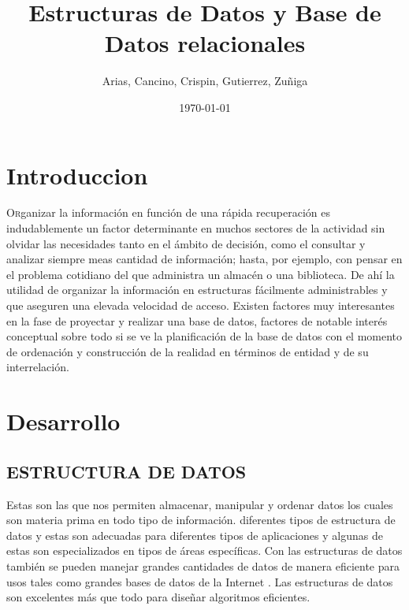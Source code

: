 \documentclass[twoside,twocolumn]{article}
\title{Estructuras de Datos y Base de Datos relacionales} %
\author{Arias, Cancino, Crispin, Gutierrez, Zuñiga}
\date{\today} %
\begin{document}
\maketitle


\section{Introduccion}

\lettrine[nindent=0em,lines=3]{O}rganizar la información en función de una rápida recuperación es indudablemente un factor determinante en muchos sectores de la actividad sin olvidar las necesidades tanto en el ámbito de decisión, como el consultar y analizar siempre meas cantidad de información; hasta, por ejemplo, con pensar en el problema cotidiano del que administra un almacén o una biblioteca. De ahí la utilidad de organizar la información en estructuras fácilmente administrables y que aseguren una elevada velocidad de acceso.
Existen factores muy interesantes en la fase de proyectar y realizar una base de datos, factores de notable interés conceptual sobre todo si se ve la planificación de la base de datos con el momento de ordenación y construcción de la realidad en términos de entidad y de su interrelación.



\section {Desarrollo}\label{sec:3}
\subsection{ESTRUCTURA DE DATOS}
Estas son las que nos permiten almacenar, manipular y ordenar datos los cuales son materia prima en todo tipo de información.
diferentes tipos de estructura de datos y estas son adecuadas para diferentes tipos de aplicaciones y algunas de estas son especializados en tipos de áreas específicas. Con las estructuras de datos también se pueden manejar grandes cantidades de datos de manera eficiente para usos tales como grandes bases de datos de la Internet . Las estructuras de datos son excelentes más que todo para diseñar algoritmos eficientes.
\end{document}
